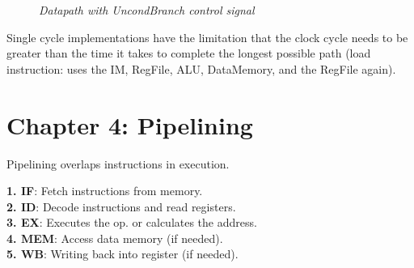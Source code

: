 \documentclass[11pt]{article}
\begin{document}
\begin{figure}[htbp]
    \centering
    \caption{\textit{Datapath with UncondBranch control signal}}
\end{figure}

Single cycle implementations have the limitation that the clock cycle needs to be greater than the time it takes to complete the longest possible path (load instruction: uses the IM, RegFile, ALU, DataMemory, and the RegFile again).

\pagebreak

\section*{Chapter 4: Pipelining}

Pipelining overlaps instructions in execution.

\begin{tcolorbox}[
    enhanced,
    attach boxed title to top left={xshift=6mm,yshift=-1.5mm},
    colback=moonstoneblue!20,
    colframe=moonstoneblue,
    colbacktitle=moonstoneblue,
    title=LEGv8 Pipelining Steps,
    fonttitle=\bfseries\color{white},
    boxed title style={size=small,colframe=moonstoneblue,sharp corners},
    sharp corners,
    label=box:logic-types,
]
    {\color{moondark}\textbf{1. IF}}: Fetch instructions from memory. \\
    {\color{moondark}\textbf{2. ID}}: Decode instructions and read registers.\\
    {\color{moondark}\textbf{3. EX}}: Executes the op. or calculates the address.\\
    {\color{moondark}\textbf{4. MEM}}: Access data memory (if needed).\\
    {\color{moondark}\textbf{5. WB}}: Writing back into register (if needed).
\end{tcolorbox}
\end{document}
